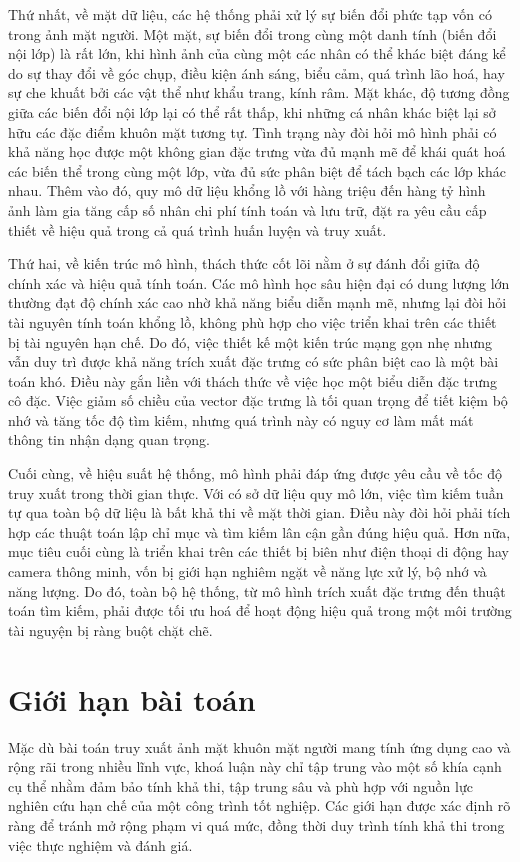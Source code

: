 Thứ nhất, về mặt dữ liệu, các hệ thống phải xử lý sự biến đổi phức tạp vốn có trong ảnh mặt người. Một mặt, sự biến đổi trong cùng một danh tính (biến đổi nội lớp) là rất lớn, khi hình ảnh của cùng một các nhân có thể khác biệt đáng kể do sự thay đổi về góc chụp, điều kiện ánh sáng, biểu cảm, quá trình lão hoá, hay sự che khuất bởi các vật thể như khẩu trang, kính râm. Mặt khác, độ tương đồng giữa các biến đổi nội lớp lại có thể rất thấp, khi những cá nhân khác biệt lại sở hữu các đặc điểm khuôn mặt tương tự. Tình trạng này đòi hỏi mô hình phải có khả năng học được một không gian đặc trưng vừa đủ mạnh mẽ để khái quát hoá các biến thể trong cùng một lớp, vừa đủ sức phân biệt để tách bạch các lớp khác nhau. Thêm vào đó, quy mô dữ liệu khổng lồ với hàng triệu đến hàng tỷ hình ảnh làm gia tăng cấp số nhân chi phí tính toán và lưu trữ, đặt ra yêu cầu cấp thiết về hiệu quả trong cả quá trình huấn luyện và truy xuất.

Thứ hai, về kiến trúc mô hình, thách thức cốt lõi nằm ở sự đánh đổi giữa độ chính xác và hiệu quả tính toán. Các mô hình học sâu hiện đại có dung lượng lớn thường đạt độ chính xác cao nhờ khả năng biểu diễn mạnh mẽ, nhưng lại đòi hỏi tài nguyên tính toán khổng lồ, không phù hợp cho việc triển khai trên các thiết bị tài nguyên hạn chế. Do đó, việc thiết kế một kiến trúc mạng gọn nhẹ nhưng vẫn duy trì được khả năng trích xuất đặc trưng có sức phân biệt cao là một bài toán khó. Điều này gắn liền với thách thức về việc học một biểu diễn đặc trưng cô đặc. Việc giảm số chiều của vector đặc trưng là tối quan trọng để tiết kiệm bộ nhớ và tăng tốc độ tìm kiếm, nhưng quá trình này có nguy cơ làm mất mát thông tin nhận dạng quan trọng.

Cuối cùng, về hiệu suất hệ thống, mô hình phải đáp ứng được yêu cầu về tốc độ truy xuất trong thời gian thực. Với có sở dữ liệu quy mô lớn, việc tìm kiếm tuần tự qua toàn bộ dữ liệu là bất khả thi về mặt thời gian. Điều này đòi hỏi phải tích hợp các thuật toán lập chỉ mục và tìm kiếm lân cận gần đúng hiệu quả. Hơn nữa, mục tiêu cuối cùng là triển khai trên các thiết bị biên như điện thoại di động hay camera thông minh, vốn bị giới hạn nghiêm ngặt về năng lực xử lý, bộ nhớ và năng lượng. Do đó, toàn bộ hệ thống, từ mô hình trích xuất đặc trưng đến thuật toán tìm kiếm, phải được tối ưu hoá để hoạt động hiệu quả trong một môi trường tài nguyện bị ràng buột chặt chẽ.

\section{Giới hạn bài toán}
Mặc dù bài toán truy xuất ảnh mặt khuôn mặt người mang tính ứng dụng cao và rộng rãi trong nhiều lĩnh vực, khoá luận này chỉ tập trung vào một số khía cạnh cụ thể nhằm đảm bảo tính khả thi, tập trung sâu và phù hợp với nguồn lực nghiên cứu hạn chế của một công trình tốt nghiệp. Các giới hạn được xác định rõ ràng để tránh mở rộng phạm vi quá mức, đồng thời duy trình tính khả thi trong việc thực nghiệm và đánh giá.

